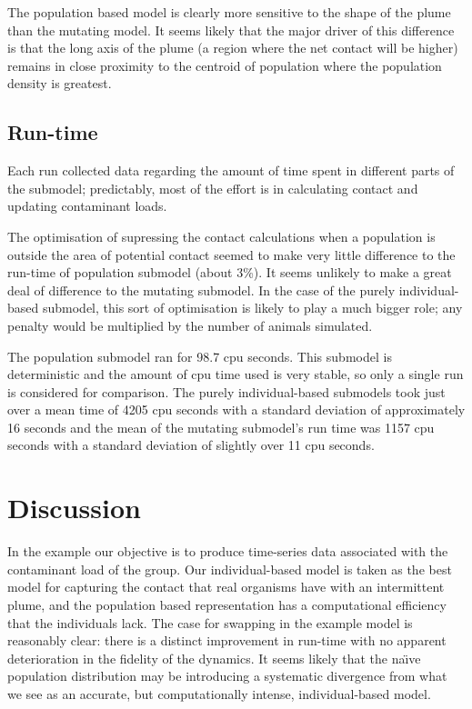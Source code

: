 The population based model is clearly more sensitive to the shape of the plume
than the mutating model. It seems likely that the major driver of this
difference is that the long axis of the plume (a region where the net contact
will be higher) remains in close proximity to the centroid of population where
the population density is greatest.

\subsection{Run-time}

Each run collected data regarding the amount of time spent in different parts
of the submodel; predictably, most of the effort is in calculating contact and
updating contaminant loads.

The optimisation of supressing the contact calculations when a population is
outside the area of potential contact seemed to make very little difference to
the run-time of population submodel (about 3\%). It seems unlikely to make a
great deal of difference to the mutating submodel. In the case of the purely
individual-based submodel, this sort of optimisation is likely to play a much
bigger role; any penalty would be multiplied by the number of animals
simulated.

The population submodel ran for 98.7 cpu seconds. This submodel is
deterministic and the amount of cpu time used is very stable, so only a single
run is considered for comparison. The purely individual-based submodels took
just over a mean time of 4205 cpu seconds with a standard deviation of
approximately 16 seconds and the mean of the mutating submodel's run time was
1157 cpu seconds with a standard deviation of slightly over 11 cpu seconds.

\section{Discussion}

In the example our objective is to produce time-series data associated with
the contaminant load of the group. Our individual-based model is taken as the
best model for capturing the contact that real organisms have with an
intermittent plume, and the population based representation has a
computational efficiency that the individuals lack. The case for swapping in
the example model is reasonably clear: there is a distinct improvement in
run-time with no apparent deterioration in the fidelity of the dynamics. It
seems likely that the na\"{\i}ve population distribution may be introducing a
systematic divergence from what we see as an accurate, but computationally
intense, individual-based model.

